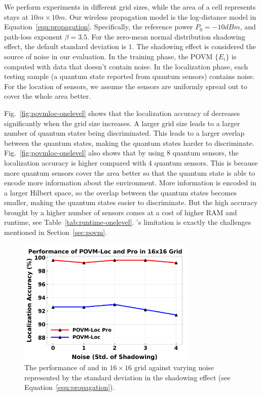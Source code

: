 We perform experiments in different grid sizes, while the area of a cell represents stays at $10m \times 10m$.
Our wireless propagation model is the log-distance model in Equation~\ref{equ:propagation}.
Specifically, the reference power $P_0=-10 dBm$, and path-loss exponent $\beta=3.5$.
For the zero-mean normal distribution shadowing effect, the default standard deviation is $1$.
The shadowing effect is considered the source of noise in our evaluation.
In the training phase, the POVM $\{E_i \}$ is computed with data that doesn't contain noise.
In the localization phase, each testing sample (a quantum state reported from quantum sensors) contains noise.
For the location of sensors, we assume the sensors are uniformly spread out to cover the whole area better.


Fig.~\ref{fig:povmloc-onelevel} shows that the localization accuracy of \povmone decreases significantly when the grid size increases.
A larger grid size leads to a larger number of quantum states being discriminated.
This leads to a larger overlap between the quantum states, making the quantum states harder to discriminate.
Fig.~\ref{fig:povmloc-onelevel} also shows that by using 8 quantum sensors, the localization accuracy is higher compared with 4 quantum sensors.
This is because more quantum sensors cover the area better so that the quantum state is able to encode more information about the environment.
More information is encoded in a larger Hilbert space, so the overlap between the quantum states becomes smaller, making the quantum states easier to discriminate.
But the high accuracy brought by a higher number of sensors comes at a cost of higher RAM and runtime, see Table~\ref{tab:runtime-onelevel}.
\povmone's limitation is exactly the challenges mentioned in Section~\ref{sec:povm}.




\begin{figure}[t]
    \centering
    \includegraphics[width=0.75\textwidth]{chapters/qce/figures/twolevel-varynoise.png}
    \caption{The performance of \povm and \povmpro in $16\times 16$ grid against varying noise represented by the standard deviation in the shadowing effect (see Equation~\ref{equ:propagation}).}
    \label{fig:povmloc}
\end{figure}



